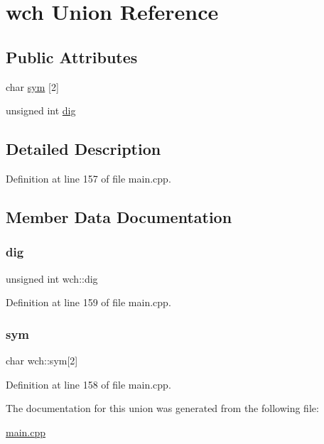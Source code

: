 \hypertarget{unionwch}{}\section{wch Union Reference}
\label{unionwch}
\subsection*{Public Attributes}
\begin{DoxyCompactItemize}
\item 
char \hyperlink{unionwch_af55b442864f410a46904f7fb15c1ca3a}{sym} \mbox{[}2\mbox{]}
\item 
unsigned int \hyperlink{unionwch_aa8de173ef97cc017c30e24819ab3a10a}{dig}
\end{DoxyCompactItemize}


\subsection{Detailed Description}


Definition at line 157 of file main.\+cpp.



\subsection{Member Data Documentation}
\mbox{\label{unionwch_aa8de173ef97cc017c30e24819ab3a10a}} 
\subsubsection{\texorpdfstring{dig}{dig}}
{\footnotesize\ttfamily unsigned int wch\+::dig}



Definition at line 159 of file main.\+cpp.

\mbox{\label{unionwch_af55b442864f410a46904f7fb15c1ca3a}} 
\subsubsection{\texorpdfstring{sym}{sym}}
{\footnotesize\ttfamily char wch\+::sym\mbox{[}2\mbox{]}}



Definition at line 158 of file main.\+cpp.



The documentation for this union was generated from the following file\+:\begin{DoxyCompactItemize}
\item 
\hyperlink{main_8cpp}{main.\+cpp}\end{DoxyCompactItemize}
